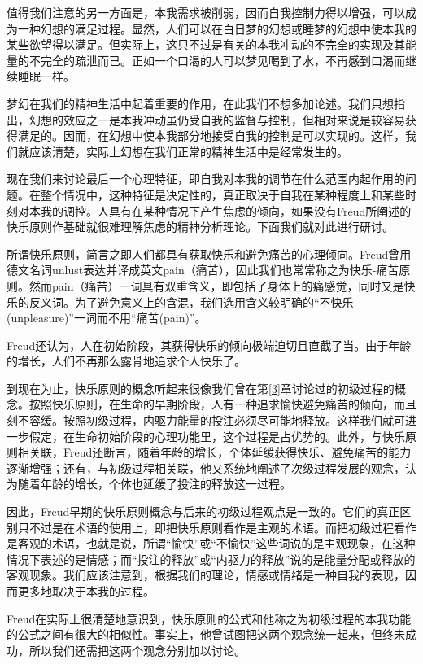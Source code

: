 \documentclass[UTF8,10pt,a4paper,openany]{book}
\begin{document}
值得我们注意的另一方面是，本我需求被削弱，因而自我控制力得以增强，可以成为一种幻想的满足过程。显然，人们可以在白日梦的幻想或睡梦的幻想中使本我的某些欲望得以满足。但实际上，这只不过是有关的本我冲动的不完全的实现及其能量的不完全的疏泄而已。正如一个口渴的人可以梦见喝到了水，不再感到口渴而继续睡眠一样。

梦幻在我们的精神生活中起着重要的作用，在此我们不想多加论述。我们只想指出，幻想的效应之一是本我冲动虽仍受自我的监督与控制，但相对来说是较容易获得满足的。因而，在幻想中使本我部分地接受自我的控制是可以实现的。这样，我们就应该清楚，实际上幻想在我们正常的精神生活中是经常发生的。

现在我们来讨论最后一个心理特征，即自我对本我的调节在什么范围内起作用的问题。在整个情况中，这种特征是决定性的，真正取决于自我在某种程度上和某些时刻对本我的调控。人具有在某种情况下产生焦虑的倾向，如果没有Freud所阐述的快乐原则作基础就很难理解焦虑的精神分析理论。下面我们就对此进行研讨。

所谓快乐原则，简言之即人们都具有获取快乐和避免痛苦的心理倾向。Freud曾用德文名词unlust表达并译成英文pain（痛苦），因此我们也常常称之为快乐-痛苦原则。然而pain（痛苦）一词具有双重含义，即包括了身体上的痛感觉，同时又是快乐的反义词。为了避免意义上的含混，我们选用含义较明确的“不快乐(unpleasure)”一词而不用“痛苦(pain)”。

Freud还认为，人在初始阶段，其获得快乐的倾向极端迫切且直截了当。由于年龄的增长，人们不再那么露骨地追求个人快乐了。

到现在为止，快乐原则的概念听起来很像我们曾在第\ref{3}章讨论过的初级过程的概念。按照快乐原则，在生命的早期阶段，人有一种追求愉快避免痛苦的倾向，而且刻不容缓。按照初级过程，内驱力能量的投注必须尽可能地释放。这样我们就可进一步假定，在生命初始阶段的心理功能里，这个过程是占优势的。此外，与快乐原则相关联，Freud还断言，随着年龄的增长，个体延缓获得快乐、避免痛苦的能力逐渐增强；还有，与初级过程相关联，他又系统地阐述了次级过程发展的观念，认为随着年龄的增长，个体也延缓了投注的释放这一过程。

因此，Freud早期的快乐原则概念与后来的初级过程观点是一致的。它们的真正区别只不过是在术语的使用上，即把快乐原则看作是主观的术语。而把初级过程看作是客观的术语，也就是说，所谓“愉快”或“不愉快”这些词说的是主观现象，在这种情况下表述的是情感；而“投注的释放”或“内驱力的释放”说的是能量分配或释放的客观现象。我们应该注意到，根据我们的理论，情感或情绪是一种自我的表现，因而更多地取决于本我的过程。

Freud在实际上很清楚地意识到，快乐原则的公式和他称之为初级过程的本我功能的公式之间有很大的相似性。事实上，他曾试图把这两个观念统一起来，但终未成功，所以我们还需把这两个观念分别加以讨论。
\end{document}
